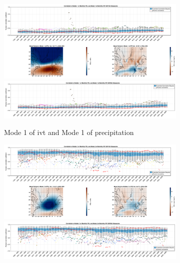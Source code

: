 \begin{figure}[!htbp]
    \centering
  \begin{subfigure}[b]{0.95\textwidth}
    \includegraphics[width=\textwidth]{figures/correlation_boxplot_psl_pr_modes11_ssp126_50seasons.png}
    \includegraphics[width=\textwidth]{figures/correlation_boxplot_psl_pr_modes11_ssp585_50seasons.png}
    \caption{Mode 1 of \ac{ivt} and Mode 1 of precipitation}
    \label{fig:cor psl pr modes11}
  \end{subfigure}
  \hfill
  \begin{subfigure}[b]{0.95\textwidth}
    \includegraphics[width=\textwidth]{figures/correlation_boxplot_psl_pr_modes22_ssp126_50seasons.png}
    \includegraphics[width=\textwidth]{figures/correlation_boxplot_psl_pr_modes22_ssp585_50seasons.png}

\end{subfigure}
\end{figure}
